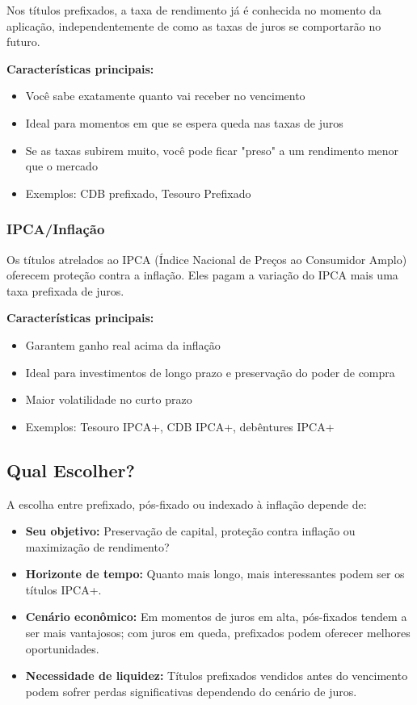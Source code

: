 \noindent Nos títulos prefixados, a taxa de rendimento já é conhecida no momento da aplicação, independentemente de como as taxas de juros se comportarão no futuro.

\vspace{0.5cm}
\noindent \textbf{Características principais:}
\begin{itemize}[leftmargin=*]
    \item Você sabe exatamente quanto vai receber no vencimento
    \item Ideal para momentos em que se espera queda nas taxas de juros
    \item Se as taxas subirem muito, você pode ficar "preso" a um rendimento menor que o mercado
    \item Exemplos: CDB prefixado, Tesouro Prefixado
\end{itemize}

\subsubsection{IPCA/Inflação}

\noindent Os títulos atrelados ao IPCA (Índice Nacional de Preços ao Consumidor Amplo) oferecem proteção contra a inflação. Eles pagam a variação do IPCA mais uma taxa prefixada de juros.

\vspace{0.5cm}
\noindent \textbf{Características principais:}
\begin{itemize}[leftmargin=*]
    \item Garantem ganho real acima da inflação
    \item Ideal para investimentos de longo prazo e preservação do poder de compra
    \item Maior volatilidade no curto prazo
    \item Exemplos: Tesouro IPCA+, CDB IPCA+, debêntures IPCA+
\end{itemize}

\subsection{Qual Escolher?}

\noindent A escolha entre prefixado, pós-fixado ou indexado à inflação depende de:

\begin{itemize}[leftmargin=*]
    \item \textbf{Seu objetivo:} Preservação de capital, proteção contra inflação ou maximização de rendimento?
    \item \textbf{Horizonte de tempo:} Quanto mais longo, mais interessantes podem ser os títulos IPCA+.
    \item \textbf{Cenário econômico:} Em momentos de juros em alta, pós-fixados tendem a ser mais vantajosos; com juros em queda, prefixados podem oferecer melhores oportunidades.
    \item \textbf{Necessidade de liquidez:} Títulos prefixados vendidos antes do vencimento podem sofrer perdas significativas dependendo do cenário de juros.
\end{itemize}

